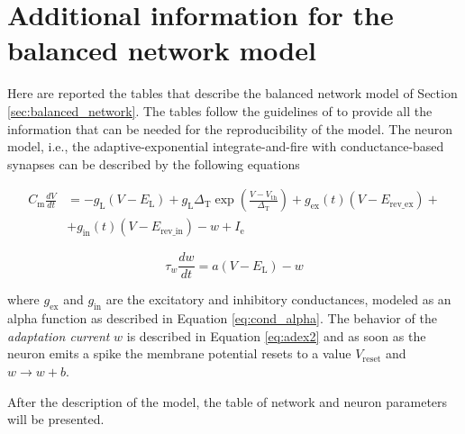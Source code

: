 \documentclass[a4paper, 12pt, twoside, openright]{book}
\begin{document}
\chapter{Additional information for the balanced network model}
\label{app:balanced_network}

Here are reported the tables that describe the balanced network model of Section \ref{sec:balanced_network}. The tables follow the guidelines of \cite{Nordlie2009} to provide all the information that can be needed for the reproducibility of the model. The neuron model, i.e., the adaptive-exponential integrate-and-fire with conductance-based synapses can be described by the following equations

\begin{equation}
\begin{split}
    C_{\text{m}} \frac{dV}{dt} &= -g_{\text{L}}(V-E_{\text{L}}) + g_{\text{L}}\Delta _{\text{T}} \exp\left( \frac{V-V_{\text{th}}}{\Delta _{\text{T}}} \right) + g_{\text{ex}}(t) (V - E_{\text{rev\_ex}}) +\\
    &+ g_{\text{in}}(t) (V - E_{\text{rev\_in}}) - w + I_{\text{e}}
\end{split}
\label{eq:adex1}
\end{equation}

\begin{equation}
    \tau_w \frac{dw}{dt} = a(V - E_{\text{L}}) - w
\label{eq:adex2}
\end{equation}

where $g_{\text{ex}}$ and $g_{\text{in}}$ are the excitatory and inhibitory conductances, modeled as an alpha function as described in Equation \eqref{eq:cond_alpha}. The behavior of the \textit{adaptation current} $w$ is described in Equation \eqref{eq:adex2} and as soon as the neuron emits a spike the membrane potential resets to a value $V_{\text{reset}}$ and $w\rightarrow w+b$.
 
After the description of the model, the table of network and neuron parameters will be presented.

\renewcommand{\arraystretch}{1.2}
\end{document}
